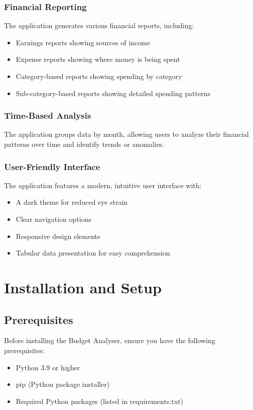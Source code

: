 \documentclass[11pt,a4paper]{report}
\begin{document}
\subsection{Financial Reporting}
The application generates various financial reports, including:
\begin{itemize}
    \item Earnings reports showing sources of income
    \item Expense reports showing where money is being spent
    \item Category-based reports showing spending by category
    \item Sub-category-based reports showing detailed spending patterns
\end{itemize}

\subsection{Time-Based Analysis}
The application groups data by month, allowing users to analyze their financial patterns over time and identify trends or anomalies.

\subsection{User-Friendly Interface}
The application features a modern, intuitive user interface with:
\begin{itemize}
    \item A dark theme for reduced eye strain
    \item Clear navigation options
    \item Responsive design elements
    \item Tabular data presentation for easy comprehension
\end{itemize}

\chapter{Installation and Setup}

\section{Prerequisites}
Before installing the Budget Analyser, ensure you have the following prerequisites:

\begin{itemize}
    \item Python 3.9 or higher
    \item pip (Python package installer)
    \item Required Python packages (listed in requirements.txt)
\end{itemize}
\end{document}
